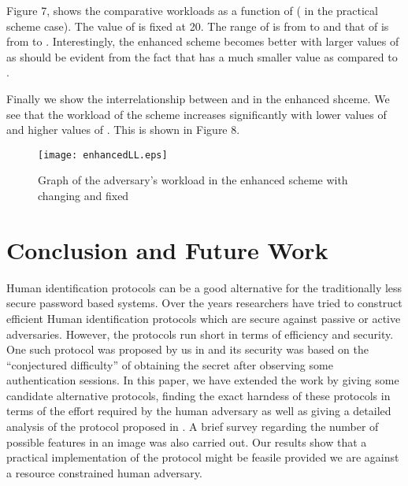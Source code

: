 \documentclass{llncs}
\begin{document}
Figure 7, shows the comparative workloads as a function of  ( in the practical scheme case). The value of  is fixed at 20. The range of  is from  to  and that of  is from  to . Interestingly, the enhanced scheme becomes better with larger values of  as should be evident from the fact that  has a much smaller value as compared to .

Finally we show the interrelationship between  and  in the enhanced shceme. We see that the workload of the scheme increases significantly with lower values of  and higher values of . This is shown in Figure 8.
\begin{figure}[ht]
\centerline{\texttt{[image: enhancedLL.eps]}}
\caption{Graph of the adversary's workload in the enhanced scheme with changing  and fixed }
\label{fig4}
\end{figure}
\section{Conclusion and Future Work}
Human identification protocols can be a good alternative for the traditionally less secure password based systems. Over the years researchers have tried to construct efficient Human identification protocols which are secure against passive or active adversaries. However, the protocols run short in terms of efficiency and security. One such protocol was proposed by us in \cite{hassan} and its security was based on the ``conjectured difficulty'' of obtaining the secret after observing some authentication sessions. In this paper, we have extended the work by giving some candidate alternative protocols, finding the exact harndess of these protocols in terms of the effort required by the human adversary as well as giving a detailed analysis of the protocol proposed in \cite{hassan}. A brief survey regarding the number of possible features in an image was also carried out. Our results show that a practical implementation of the protocol might be feasile provided we are against a resource constrained human adversary.
\end{document}
